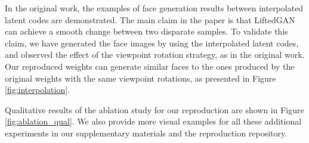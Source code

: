 In the original work, the examples of face generation results between interpolated latent codes are demonstrated. The main claim in the paper is that LiftedGAN can achieve a smooth change between two disparate samples. To validate this claim, we have generated the face images by using the interpolated latent codes, and observed the effect of the viewpoint rotation strategy, as in the original work. Our reproduced weights can generate similar faces to the ones produced by the original weights with the same viewpoint rotations, as presented in Figure \ref{fig:interpolation}. 

Qualitative results of the ablation study for our reproduction are shown in Figure \ref{fig:ablation_qual}. We also provide more visual examples for all these additional experiments in our supplementary materials and the reproduction repository.







